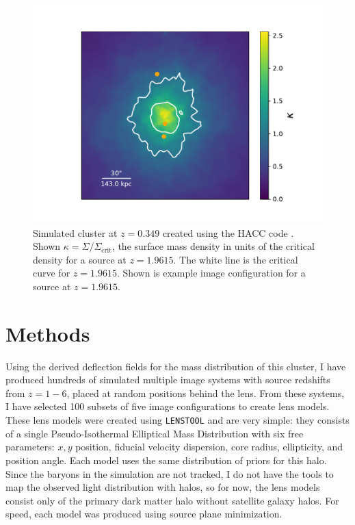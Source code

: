 \begin{figure}
\centering
\includegraphics[width=\textwidth,trim={0 33pt 0 40pt},clip]{Chap6/cluster.pdf}
\caption[Simulated cluster from created using HACC]{Simulated cluster at $z=0.349$ created using the HACC code \citep{Habib:2016cy}. Shown $\kappa=\Sigma/\Sigma_\mathrm{crit}$, the surface mass density in units of the critical density for a source at $z=1.9615$. The white line is the critical curve for $z=1.9615$. Shown is example image configuration for a source at $z=1.9615$.}
\label{chap6:fig:cluster}
\end{figure}

\section{Methods}

Using the derived deflection fields for the mass distribution of this cluster, I have produced hundreds of simulated multiple image systems with source redshifts from $z=1-6$, placed at random positions behind the lens. From these systems, I have selected 100 subsets of five image configurations to create lens models. These lens models were created using \texttt{LENSTOOL} and are very simple: they consists of a single Pseudo-Isothermal Elliptical Mass Distribution with six free parameters: $x,y$ position, fiducial velocity dispersion, core radius, ellipticity, and position angle. Each model uses the same distribution of priors for this halo. Since the baryons in the simulation are not tracked, I do not have the tools to map the observed light distribution with halos, so for now, the lens models consist only of the primary dark matter halo without satellite galaxy halos. For speed, each model was produced using source plane minimization.

